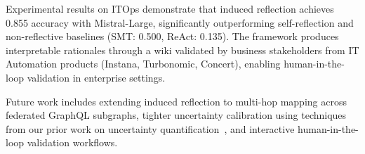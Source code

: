 \documentclass[sigconf, nonacm]{acmart}
\begin{document}
Experimental results on ITOps demonstrate that induced reflection achieves 0.855 accuracy with Mistral-Large, significantly outperforming self-reflection and non-reflective baselines (SMT: 0.500, ReAct: 0.135). The framework produces interpretable rationales through a wiki validated by business stakeholders from IT Automation products (Instana, Turbonomic, Concert), enabling human-in-the-loop validation in enterprise settings.

Future work includes extending induced reflection to multi-hop mapping across federated GraphQL subgraphs, tighter uncertainty calibration using techniques from our prior work on uncertainty quantification~\cite{simba_uq,consistency_hypothesis}, and interactive human-in-the-loop validation workflows.


\clearpage


\end{document}

